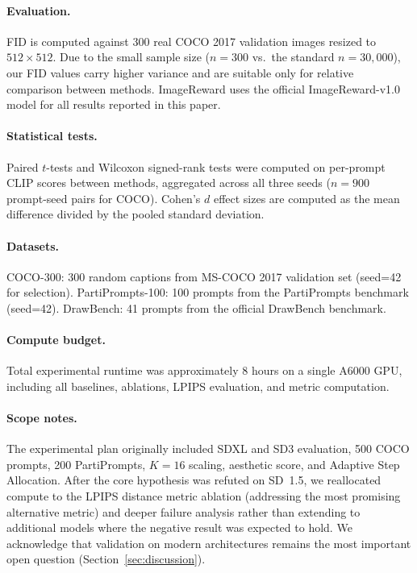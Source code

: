 \documentclass{article}
\begin{document}
\paragraph{Evaluation.} FID is computed against 300 real COCO 2017 validation images resized to $512 \times 512$. Due to the small sample size ($n=300$ vs.\ the standard $n=30{,}000$), our FID values carry higher variance and are suitable only for relative comparison between methods. ImageReward uses the official ImageReward-v1.0 model for all results reported in this paper.

\paragraph{Statistical tests.} Paired $t$-tests and Wilcoxon signed-rank tests were computed on per-prompt CLIP scores between methods, aggregated across all three seeds ($n=900$ prompt-seed pairs for COCO). Cohen's $d$ effect sizes are computed as the mean difference divided by the pooled standard deviation.

\paragraph{Datasets.} COCO-300: 300 random captions from MS-COCO 2017 validation set (seed=42 for selection). PartiPrompts-100: 100 prompts from the PartiPrompts benchmark (seed=42). DrawBench: 41 prompts from the official DrawBench benchmark.

\paragraph{Compute budget.} Total experimental runtime was approximately 8 hours on a single A6000 GPU, including all baselines, ablations, LPIPS evaluation, and metric computation.

\paragraph{Scope notes.} The experimental plan originally included SDXL and SD3 evaluation, 500 COCO prompts, 200 PartiPrompts, $K=16$ scaling, aesthetic score, and Adaptive Step Allocation. After the core hypothesis was refuted on SD~1.5, we reallocated compute to the LPIPS distance metric ablation (addressing the most promising alternative metric) and deeper failure analysis rather than extending to additional models where the negative result was expected to hold. We acknowledge that validation on modern architectures remains the most important open question (Section~\ref{sec:discussion}).
\end{document}
